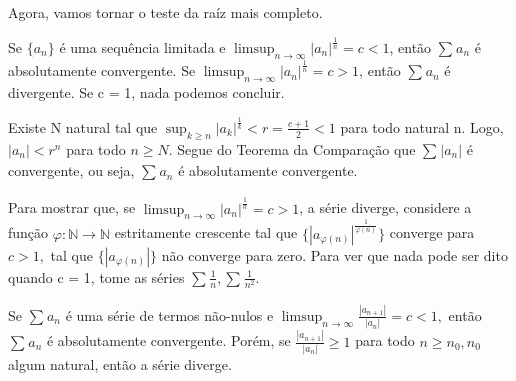 \documentclass[Analysis/analysis_notes.tex]{subfiles}
\begin{document}
Agora, vamos tornar o teste da ra\'iz mais completo.
\begin{theorem*}
	Se $\{a_{n}\}$ \'e uma sequ\^encia limitada e $\limsup_{n\to\infty}|a_{n}|^{\frac{1}{n}} = c < 1$, ent\~ao $\sum\limits_{}^{}a_{n}$
	\'e absolutamente convergente. Se $\limsup_{n\to\infty}|a_{n}|^{\frac{1}{n}} = c > 1$, ent\~ao $\sum\limits_{}^{}a_{n}$ \'e divergente.
	Se c = 1, nada podemos concluir.
\end{theorem*}
\begin{proof*}
	Existe N natural tal que $\sup_{k\geq{n}}|a_{k}|^{\frac{1}{k}} < r = \frac{c+1}{2} < 1$ para todo natural n. Logo, $|a_{n}|<r^{n}$ para
	todo $n\geq{N}.$ Segue do Teorema da Compara\c c\~ao que $\sum\limits_{}^{}|a_{n}|$ \'e convergente, ou seja, $\sum\limits_{}^{}a_{n}$ \'e absolutamente convergente. \qedsymbol

	Para mostrar que, se $\limsup_{n\to\infty}|a_{n}|^{\frac{1}{n}} = c > 1$, a s\'erie diverge, considere a fun\c c\~ao $\varphi:\mathbb{N}\rightarrow \mathbb{N}$
	estritamente crescente tal que $\{|a_{\varphi(n)}|^{\frac{1}{\varphi(n)}}\}$ converge para $c>1,$ tal que $\{|a_{\varphi(n)}|\}$
	n\~ao converge para zero. Para ver que nada pode ser dito quando c = 1, tome as s\'eries $\sum\limits_{}^{}\frac{1}{n}, \sum\limits_{}^{}\frac{1}{n^{2}}.$
\end{proof*}
\begin{theorem*}
	Se $\sum\limits_{}^{}a_{n}$ \'e uma s\'erie de termos n\~ao-nulos e $\limsup_{n\to\infty}\frac{|a_{n+1}|}{|a_{n}|} = c < 1,$ ent\~ao
	$\sum\limits_{}^{}a_{n}$ \'e absolutamente convergente. Por\'em, se $\frac{|a_{n+1}|}{|a_{n}|}\geq{1}$ para todo $n\geq{n_{0}}, n_{0}$ algum natural,
	ent\~ao a s\'erie diverge.
\end{theorem*}
\end{document}

